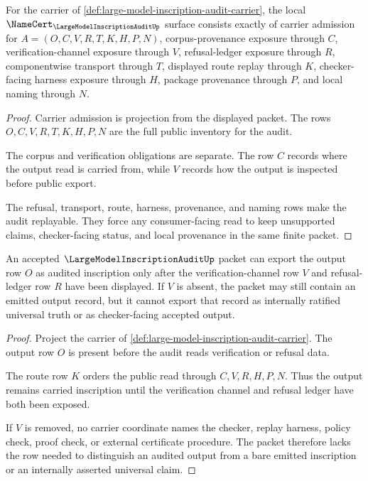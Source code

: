 \begin{theorem}
\label{thm:large-model-inscription-audit-namecert-obligations}
For the carrier of \autoref{def:large-model-inscription-audit-carrier}, the local $\NameCert_{\LargeModelInscriptionAuditUp}$ surface consists exactly of carrier admission for $A=(O,C,V,R,T,K,H,P,N)$, corpus-provenance exposure through $C$, verification-channel exposure through $V$, refusal-ledger exposure through $R$, componentwise transport through $T$, displayed route replay through $K$, checker-facing harness exposure through $H$, package provenance through $P$, and local naming through $N$.
\end{theorem}
\begin{proof}
Carrier admission is projection from the displayed packet. The rows $O,C,V,R,T,K,H,P,N$ are the full public inventory for the audit.

The corpus and verification obligations are separate. The row $C$ records where the output read is carried from, while $V$ records how the output is inspected before public export.

The refusal, transport, route, harness, provenance, and naming rows make the audit replayable. They force any consumer-facing read to keep unsupported claims, checker-facing status, and local provenance in the same finite packet.
\end{proof}

\begin{theorem}
\label{thm:large-model-inscription-audit-output-verification-boundary}
An accepted $\LargeModelInscriptionAuditUp$ packet can export the output row $O$ as audited inscription only after the verification-channel row $V$ and refusal-ledger row $R$ have been displayed. If $V$ is absent, the packet may still contain an emitted output record, but it cannot export that record as internally ratified universal truth or as checker-facing accepted output.
\end{theorem}
\begin{proof}
Project the carrier of \autoref{def:large-model-inscription-audit-carrier}. The output row $O$ is present before the audit reads verification or refusal data.

The route row $K$ orders the public read through $C,V,R,H,P,N$. Thus the output remains carried inscription until the verification channel and refusal ledger have both been exposed.

If $V$ is removed, no carrier coordinate names the checker, replay harness, policy check, proof check, or external certificate procedure. The packet therefore lacks the row needed to distinguish an audited output from a bare emitted inscription or an internally asserted universal claim.
\end{proof}

